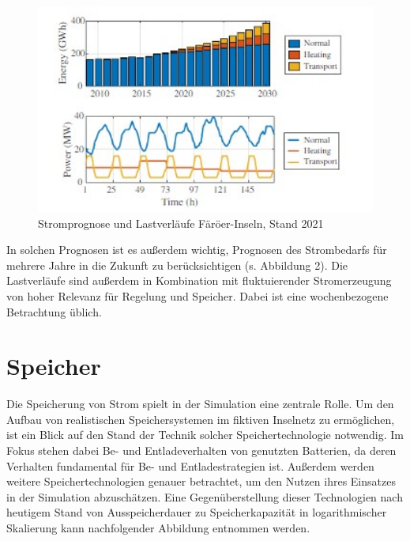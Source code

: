 \begin{figure}[h!]
    \centering
    \includegraphics[width=14cm]{Abbildungen/StandDerTechnikAbb2.jpg}
    \caption{Stromprognose und Lastverläufe Färöer-Inseln, Stand 2021\cite{trondheim-thesis}}\label{fig:Stromprognose_und_Lastverläufe}
\end{figure}

In solchen Prognosen ist es außerdem wichtig, Prognosen des Strombedarfs für mehrere Jahre in die Zukunft zu berücksichtigen (s. Abbildung 2). 
Die Lastverläufe sind außerdem in Kombination mit fluktuierender Stromerzeugung von hoher Relevanz für Regelung und Speicher. 
Dabei ist eine wochenbezogene Betrachtung üblich.

\section{Speicher}

Die Speicherung von Strom spielt in der Simulation eine zentrale Rolle. 
Um den Aufbau von realistischen Speichersystemen im fiktiven Inselnetz zu ermöglichen, 
ist ein Blick auf den Stand der Technik solcher Speichertechnologie notwendig. 
Im Fokus stehen dabei Be- und Entladeverhalten von genutzten Batterien, da deren Verhalten fundamental für Be- und Entladestrategien ist. 
Außerdem werden weitere Speichertechnologien genauer betrachtet, um den Nutzen ihres Einsatzes in der Simulation abzuschätzen. 
Eine Gegenüberstellung dieser Technologien nach heutigem Stand von Ausspeicherdauer zu Speicherkapazität in 
logarithmischer Skalierung kann nachfolgender Abbildung entnommen werden.

